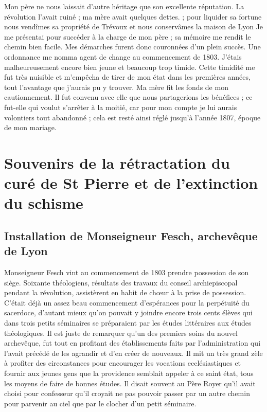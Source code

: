 \documentclass[11pt,a4paper]{report}
\begin{document}
Mon père ne nous laissait d'autre héritage que son excellente réputation. La révolution l'avait ruiné ; ma mère avait quelques dettes. ; pour liquider sa fortune nous vendîmes sa propriété de Trévoux et nous conservâmes la maison de Lyon Je me présentai pour succéder à la charge de mon père ; sa mémoire me rendit le chemin bien facile. Mes démarches furent donc couronnées d'un plein succès. Une ordonnance me nomma agent de change au commencement de 1803. J'étais malheureusement encore bien jeune et beaucoup trop timide. Cette timidité me fut très nuisible et m'empêcha de tirer de mon état dans les premières années, tout l'avantage que j'aurais pu y trouver. Ma mère fit les fonds de mon cautionnement. Il fut convenu avec elle que nous partagerions les bénéfices ; ce fut-elle qui voulut s'arrêter à la moitié, car pour mon compte je lui aurais volontiers tout abandonné ; cela est resté ainsi réglé jusqu'à l'année 1807, époque de mon mariage.

\chapter{Souvenirs de la rétractation du curé de St Pierre et de l'extinction du schisme}

\section*{Installation de Monseigneur Fesch, archevêque de Lyon}

Monseigneur Fesch vint au commencement de 1803 prendre possession de son siège. Soixante théologiens, résultats des travaux du conseil archiepiscopal pendant la révolution, assistèrent en habit de chœur à la prise de possession. C'était déjà un assez beau commencement d'espérances pour la perpétuité du sacerdoce, d'autant mieux qu'on pouvait y joindre encore trois cents élèves qui dans trois petits séminaires se préparaient par les études littéraires aux études théologiques. Il est juste de remarquer qu'un des premiers soins du nouvel archevêque, fut tout en profitant des établissements faits par l'administration qui l'avait précédé de les agrandir et d'en créer de nouveaux. Il mit un très grand zèle à profiter des circonstances pour encourager les vocations ecclésiastiques et fournir aux jeunes gens que la providence semblait appeler à ce saint état, tous les moyens de faire de bonnes études. Il disait souvent au Père Royer qu'il avait choisi pour confesseur qu'il croyait ne pas pouvoir passer par un autre chemin pour parvenir au ciel que par le clocher d'un petit séminaire.
\end{document}
